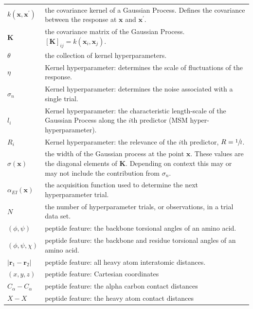 \begin{table}
\begin{tabularx}{0.9\textwidth}{ l >{\raggedright\arraybackslash}X  }
        $k(\mathbf{x}, \mathbf{x}^{\prime})$ & the covariance kernel of a Gaussian Process. Defines the covariance between the response at $\mathbf{x}$ and $\mathbf{x}^{\prime}$. \\
        $\mathbf{K}$ & the covariance matrix of the Gaussian Process. $[\mathbf{K}]_{ij} =k(\mathbf{x}_{i}, \mathbf{x}_{j})$. \\
        $\theta$ & the collection of kernel hyperparameters. \\
        $\eta$ & Kernel hyperparameter: determines the scale of fluctuations of the response. \\
        $\sigma_{n}$ & Kernel hyperparameter: determines the noise associated with a single trial. \\
        $l_{i}$ & Kernel hyperparameter: the characteristic length-scale of the Gaussian Process 
                along the $i$th predictor (MSM hyper-hyperparameter).\\
        $R_{i}$ & Kernel hyperparameter: the relevance of the $i$th predictor, $R=\sfrac{1}{l}$. \\ 
        $\sigma(\mathbf{x})$ & the width of the Gaussian process at the point $\mathbf{x}$. These values  are the diagonal elements of $\mathbf{K}$. Depending on context this may or may not include the contribution from $\sigma_{n}$. \\
        $\alpha_{EI}(\mathbf{x})$ & the acquisition function used to determine the next hyperparameter trial. \\
        $N$ & the number of hyperparameter trials, or observations,  in a trial data set.\\
        $(\phi, \psi)$ & peptide feature: the backbone torsional angles of an amino acid.  \\
        $(\phi, \psi, \chi)$ & peptide feature: the backbone and residue torsional angles of an amino acid. \\
        $|\mathbf{r}_{1}-\mathbf{r}_{2}|$ & peptide feature: all heavy atom interatomic distances.  \\
        $(x, y, z)$ & peptide feature: Cartesian coordinates \\
        $C_{\alpha}-C_{\alpha}$ & peptide feature: the alpha carbon contact distances \\
        $X-X$ & peptide feature: the heavy atom contact distances \\
     \hline
     \end{tabularx}
    \label{tab:msm_symbols}
\end{table}

